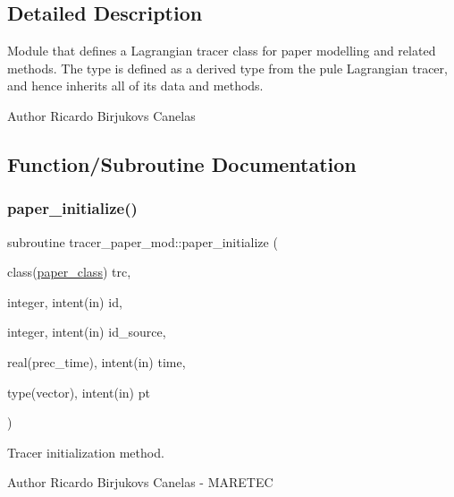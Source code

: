 \subsection{Detailed Description}
Module that defines a Lagrangian tracer class for paper modelling and related methods. The type is defined as a derived type from the pule Lagrangian tracer, and hence inherits all of it\textquotesingle{}s data and methods. 

\begin{DoxyAuthor}{Author}
Ricardo Birjukovs Canelas 
\end{DoxyAuthor}


\subsection{Function/\+Subroutine Documentation}
\mbox{\label{namespacetracer__paper__mod_a4e3b16f967d34cd206499188e17ac4f2}} 
\subsubsection{\texorpdfstring{paper\+\_\+initialize()}{paper\_initialize()}}
{\footnotesize\ttfamily subroutine tracer\+\_\+paper\+\_\+mod\+::paper\+\_\+initialize (\begin{DoxyParamCaption}\item[{class(\mbox{\hyperlink{structtracer__paper__mod_1_1paper__class}{paper\+\_\+class}})}]{trc,  }\item[{integer, intent(in)}]{id,  }\item[{integer, intent(in)}]{id\+\_\+source,  }\item[{real(prec\+\_\+time), intent(in)}]{time,  }\item[{type(vector), intent(in)}]{pt }\end{DoxyParamCaption})\hspace{0.3cm}{\ttfamily [private]}}



Tracer initialization method. 

\begin{DoxyAuthor}{Author}
Ricardo Birjukovs Canelas -\/ M\+A\+R\+E\+T\+EC
\end{DoxyAuthor}

